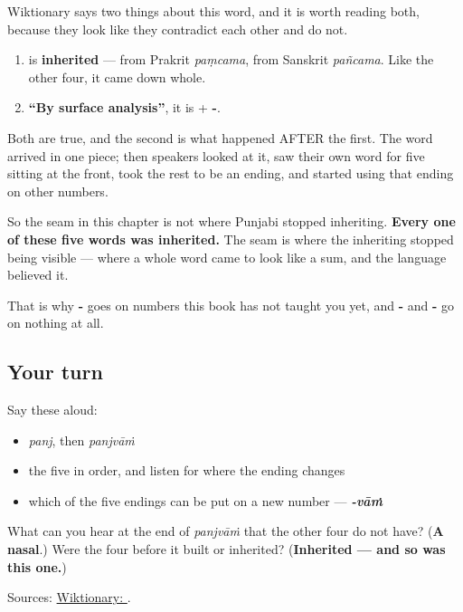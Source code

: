 \begin{grammarlens}[title={What you've built: an inherited word that turned into a rule}]
Wiktionary says two things about this word, and it is worth reading both, because they look like they contradict each other and do not.

\begin{enumerate}
\raggedright
  \item \textbf{} is \textbf{inherited} — from Prakrit \emph{paṃcama}, from Sanskrit \emph{pañcama}. Like the other four, it came down whole.
  \item \textbf{\textquotedblleft{}By surface analysis\textquotedblright{}}, it is \textbf{} + \textbf{-}.
\end{enumerate}

Both are true, and the second is what happened AFTER the first. The word arrived in one piece; then speakers looked at it, saw their own word for five sitting at the front, took the rest to be an ending, and started using that ending on other numbers.

So the seam in this chapter is not where Punjabi stopped inheriting. \textbf{Every one of these five words was inherited.} The seam is where the inheriting stopped being visible — where a whole word came to look like a sum, and the language believed it.

That is why \textbf{-} goes on numbers this book has not taught you yet, and \textbf{-} and \textbf{-} go on nothing at all.
\end{grammarlens}

\subsection*{Your turn}
Say these aloud:

\begin{itemize}
\raggedright
  \item \emph{panj}, then \emph{panjvāṁ}
  \item the five in order, and listen for where the ending changes
  \item which of the five endings can be put on a new number — \emph{\textbf{-vāṁ}}
\end{itemize}

\begin{tcolorbox}[breakable,colback=teal!4,colframe=teal!35!black,title={Before you move on}]
What can you hear at the end of \emph{panjvāṁ} that the other four do not have? (\textbf{A nasal}.) Were the four before it built or inherited? (\textbf{Inherited — and so was this one.})

Sources: \href{https://en.wiktionary.org/wiki/\%E0\%A8\%AA\%E0\%A9\%B0\%E0\%A8\%9C\%E0\%A8\%B5\%E0\%A8\%BE\%E0\%A8\%82}{Wiktionary: }.
\end{tcolorbox}
